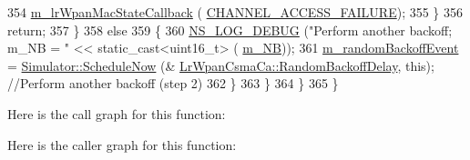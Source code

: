 \begin{DoxyCode}
354                   \hyperlink{classns3_1_1LrWpanCsmaCa_a5204cf0e1f945663d73892148abcbfc0}{m\_lrWpanMacStateCallback} (
      \hyperlink{group__lr-wpan_gga02ee7efd682937a8781f5e6101f61884a08010d1b06c1270e2e5d2b56ff4f5295}{CHANNEL\_ACCESS\_FAILURE});
355                 \}
356               \textcolor{keywordflow}{return};
357             \}
358           \textcolor{keywordflow}{else}
359             \{
360               \hyperlink{group__logging_ga413f1886406d49f59a6a0a89b77b4d0a}{NS\_LOG\_DEBUG} (\textcolor{stringliteral}{"Perform another backoff; m\_NB = "} << static\_cast<uint16\_t> (
      \hyperlink{classns3_1_1LrWpanCsmaCa_ae6fd2d3aa6c2f6ec043d9c6821932603}{m\_NB}));
361               \hyperlink{classns3_1_1LrWpanCsmaCa_a426a65b1bf9433af0e88d7dd4b4b8e10}{m\_randomBackoffEvent} = \hyperlink{classns3_1_1Simulator_a2219ee02c0647adc83d1c918c3256266}{Simulator::ScheduleNow} (&
      \hyperlink{classns3_1_1LrWpanCsmaCa_a21224101ec7187a7f9560a36172841b8}{LrWpanCsmaCa::RandomBackoffDelay}, \textcolor{keyword}{this}); \textcolor{comment}{//Perform another backoff (step 2)}
362             \}
363         \}
364     \}
365 \}
\end{DoxyCode}


Here is the call graph for this function\+:




Here is the caller graph for this function\+:


